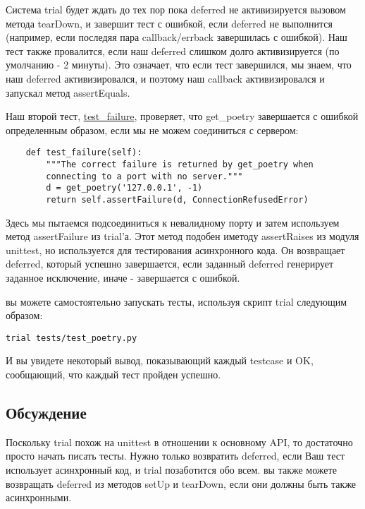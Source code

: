 Система trial будет ждать до тех пор пока deferred не 
активизируется вызовом метода tearDown, и завершит тест 
с ошибкой, если deferred не выполнится (например, если 
последяя пара callback/errback завершилась с ошибкой). 
Наш тест также провалится, если наш deferred слишком 
долго активизируется (по умолчанию - 2 минуты). Это означает, 
что если тест завершился, мы знаем, что наш deferred 
активизировался, и поэтому наш callback 
активизировался и запускал метод assertEquals.


Наш второй тест, 
\href{http://github.com/jdavisp3/twisted-intro/blob/master/tests/test\_poetry.py#L91}{test\_failure}, 
проверяет, что get\_poetry завершается с ошибкой 
определенным образом, если мы не можем соединиться 
с сервером:

 \begin{verbatim}
    def test_failure(self):
        """The correct failure is returned by get_poetry when
        connecting to a port with no server."""
        d = get_poetry('127.0.0.1', -1)
        return self.assertFailure(d, ConnectionRefusedError)

\end{verbatim} 


Здесь мы пытаемся подсоединиться к невалидному 
порту и затем используем метод assertFailure из trial'а. Этот 
метод подобен иметоду assertRaises из модуля unittest, но 
используется для тестирования асинхронного кода. Он 
возвращает deferred, который успешно завершается, если 
заданный deferred генерирует заданное исключение, 
иначе - завершается с ошибкой.


вы можете самостоятельно запускать тесты, используя скрипт trial 
следующим образом:

 \begin{verbatim}
trial tests/test_poetry.py
\end{verbatim} 


И вы увидете некоторый вывод, показывающий 
каждый testcase и OK, сообщающий, что каждый 
тест пройден успешно.


\subsection{Обсуждение}

Поскольку trial похож на unittest в отношении 
к основному API, то достаточно просто начать писать тесты. 
Нужно только возвратить deferred, если Ваш тест использует 
асинхронный код, и trial позаботится обо всем. вы также можете 
возвращать deferred из методов setUp и tearDown, если 
они должны быть также асинхронными. 



